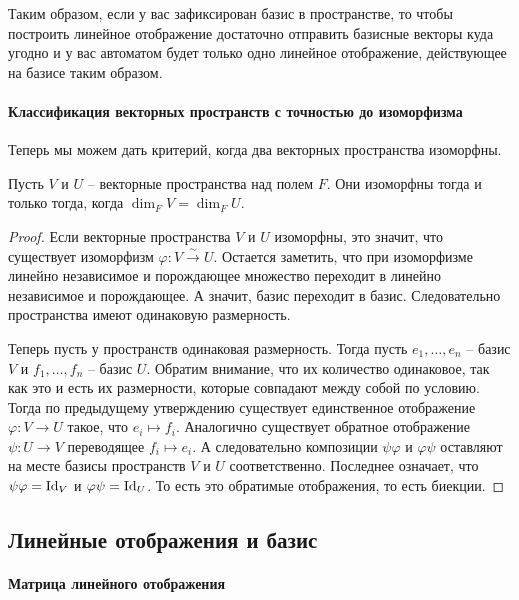 Таким образом, если у вас зафиксирован базис в пространстве, то чтобы построить линейное отображение достаточно отправить базисные векторы куда угодно и у вас автоматом будет только одно линейное отображение, действующее на базисе таким образом.

\paragraph{Классификация векторных пространств с точностью до изоморфизма}

Теперь мы можем дать критерий, когда два векторных пространства изоморфны.

\begin{claim}\label{claim::VectorClassific}
Пусть $V$ и $U$ -- векторные пространства над полем $F$. Они изоморфны тогда и только тогда, когда $\dim_F V = \dim_F U$.
\end{claim}
\begin{proof}
Если векторные пространства $V$  и $U$ изоморфны, это значит, что существует изоморфизм $\varphi\colon V\stackrel{\sim}{\longrightarrow} U$. Остается заметить, что при изоморфизме линейно независимое и порождающее множество переходит в линейно независимое и порождающее. А значит, базис переходит в базис. Следовательно пространства имеют одинаковую размерность.

Теперь пусть у пространств одинаковая размерность. Тогда пусть $e_1,\ldots,e_n$ -- базис $V$ и $f_1,\ldots,f_n$ -- базис $U$. Обратим внимание, что их количество одинаковое, так как это и есть их размерности, которые совпадают между собой по условию. Тогда по предыдущему утверждению существует единственное отображение $\varphi\colon V\to U$ такое, что $e_i\mapsto f_i$. Аналогично существует обратное отображение $\psi\colon U\to V$ переводящее $f_i\mapsto e_i$. А следовательно композиции $\psi\varphi$ и $\varphi\psi$ оставляют на месте базисы пространств $V$ и $U$ соответственно. Последнее означает, что  $\psi\varphi = \operatorname{Id}_V$ и $\varphi\psi = \operatorname{Id}_U$. То есть это обратимые отображения, то есть биекции.
\end{proof}

\subsection{Линейные отображения и базис}

\paragraph{Матрица линейного отображения}

